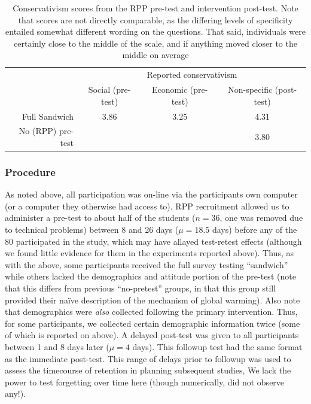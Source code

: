 \begin{table}
    \caption{Conservativism scores from the RPP pre-test and intervention
        post-test. Note that scores are not directly comparable, as the
        differing levels of specificity entailed somewhat different wording on
        the questions. That said, individuals were certainly close to the middle
        of the scale, and if anything moved closer to the middle on average}
    \label{table:mech-rpp-cons}
\centering
\begin{tabular}{rccc}
  \toprule
   & \multicolumn{3}{c}{Reported conservativism} \\
   & Social (pre-test) & Economic (pre-test) & Non-specific (post-test) \\ 
  \midrule
  Full Sandwich & 3.86 & 3.25 & 4.31 \\
  No (RPP) pre-test & & & 3.80 \\
  \bottomrule
\end{tabular}
\end{table}



\subsubsection{Procedure}

As noted above, all participation was on-line via the participants own computer
(or a computer they otherwise had access to). RPP recruitment allowed us to
administer a pre-test to about half of the students ($n=36$, one was removed due
to technical problems) between 8 and 26 days ($\mu=18.5$ days) before any of the
80 participated in the study, which may have allayed test-retest effects
(although we found little evidence for them in the experiments reported above).
Thus, as with the above, some participants received the full survey testing
``sandwich'' while others lacked the demographics and attitude portion of the
pre-test (note that this differs from previous “no-pretest” groups, in that this
group still provided their na\"ive description of the mechanism of global
warming). Also note that demographics were \emph{also} collected following the
primary intervention. Thus, for some participants, we collected certain
demographic information twice (some of which is reported on above).
A delayed post-test was given to all participants between 1 and 8 days later
($\mu=4$ days). This followup test had the same format as the immediate
post-test. This range of delays prior to followup was used to assess the
timecourse of retention in planning subsequent studies, We lack the power to
test forgetting over time here (though numerically, did not observe any!).

